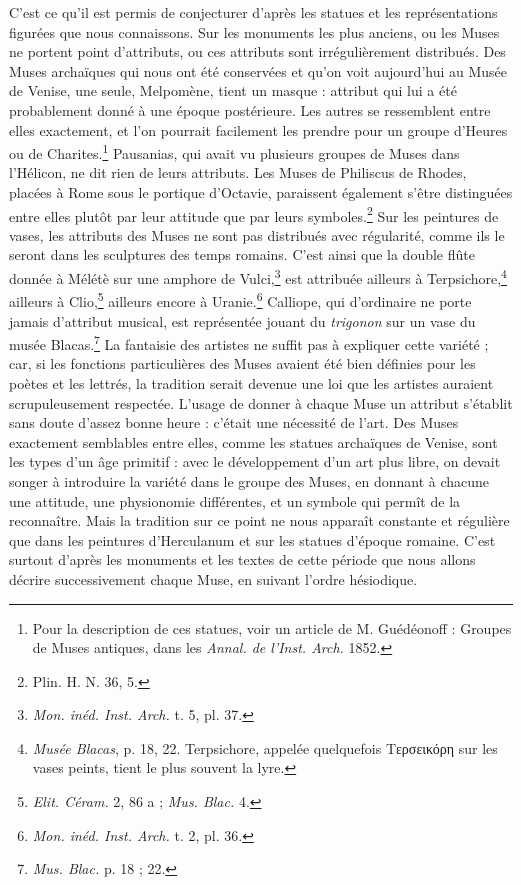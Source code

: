 \documentclass[landscape, a4paper, 11pt, oneside, polutonikogreek, french]{article}
\begin{document}
C'est ce qu'il est permis de conjecturer d'après les statues et les représentations figurées que nous connaissons. Sur les monuments les plus anciens, ou les Muses ne portent point d'attributs, ou ces attributs sont irrégulièrement distribués. Des Muses archaïques qui nous ont été conservées et qu'on voit aujourd'hui au Musée de Venise, une seule, Melpomène, tient un masque : attribut qui lui a été probablement donné à une époque postérieure. Les autres se ressemblent entre elles exactement, et l'on pourrait facilement les prendre pour un groupe d'Heures ou de Charites.\footnote{Pour la description de ces statues, voir un article de M. Guédéonoff : Groupes de Muses antiques, dans les \emph{Annal. de l'Inst. Arch.} 1852.} Pausanias, qui avait vu plusieurs groupes de Muses dans l'Hélicon, ne dit rien de leurs attributs. Les Muses de Philiscus de Rhodes, placées à Rome sous le portique d'Octavie, paraissent également s'être distinguées entre elles plutôt par leur attitude que par leurs symboles.\footnote{Plin. H. N. 36, 5.} Sur les peintures de vases, les attributs des Muses ne sont pas distribués avec régularité, comme ils le seront dans les sculptures des temps romains. C'est ainsi que la double flûte donnée à Mélétè sur une amphore de Vulci,\footnote{\emph{Mon. inéd. Inst. Arch.} t. 5, pl. 37.} est attribuée ailleurs à Terpsichore,\footnote{\emph{Musée Blacas}, p. 18, 22. Terpsichore, appelée quelquefois Τερσεικόρη sur les vases peints, tient le plus souvent la lyre.} ailleurs à Clio,\footnote{\emph{Elit. Céram.} 2, 86 a ; \emph{Mus. Blac.} 4.} ailleurs encore à Uranie.\footnote{\emph{Mon. inéd. Inst. Arch.} t. 2, pl. 36.} Calliope, qui d'ordinaire ne porte jamais d'attribut musical, est représentée jouant du \emph{trigonon} sur un vase du musée Blacas.\footnote{\emph{Mus. Blac.} p. 18 ; 22.} La fantaisie des artistes ne suffit pas à expliquer cette variété ; car, si les fonctions particulières des Muses avaient été bien définies pour les poètes et les lettrés, la tradition serait devenue une loi que les artistes auraient scrupuleusement respectée. L'usage de donner à chaque Muse un attribut s'établit sans doute d'assez bonne heure : c'était une nécessité de l'art. Des Muses exactement semblables entre elles, comme les statues archaïques de Venise, sont les types d'un âge primitif : avec le développement d'un art plus libre, on devait songer à introduire la variété dans le groupe des Muses, en donnant à chacune une attitude, une physionomie différentes, et un symbole qui permît de la reconnaître. Mais la tradition sur ce point ne nous apparaît constante et régulière que dans les peintures d'Herculanum et sur les statues d'époque romaine. C'est surtout d'après les monuments et les textes de cette période que nous allons décrire successivement chaque Muse, en suivant l'ordre hésiodique.
\end{document}
